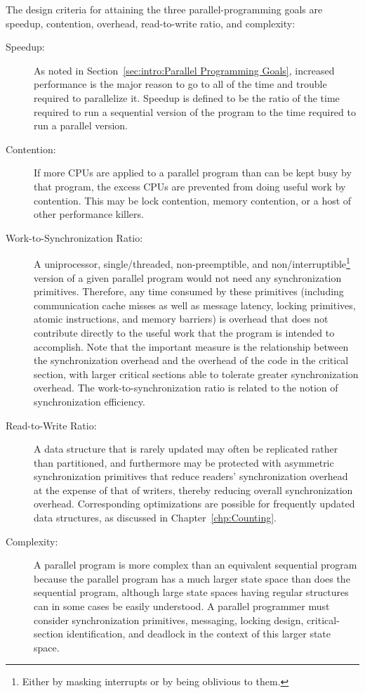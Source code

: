 The design criteria for attaining the three parallel-programming goals
are speedup,
contention, overhead, read-to-write ratio, and complexity:
\begin{description}
\item[Speedup:]  As noted in
	Section~\ref{sec:intro:Parallel Programming Goals},
	increased performance is the major reason
	to go to all of the time and trouble
	required to parallelize it.
	Speedup is defined to be the ratio of the time required
	to run a sequential version of the program to the time
	required to run a parallel version.
\item[Contention:]  If more CPUs are applied to a parallel
	program than can be kept busy by that program,
	the excess CPUs are prevented from doing
	useful work by contention.
	This may be lock contention, memory contention, or a host
	of other performance killers.
\item[Work-to-Synchronization Ratio:]  A uniprocessor,
	single\-/threaded, non-preemptible, and non\-/interruptible\footnote{
		Either by masking interrupts or by being oblivious to them.}
	version of a given parallel
	program would not need any synchronization primitives.
	Therefore, any time consumed by these primitives
	(including communication cache misses as well as
	message latency, locking primitives, atomic instructions,
	and memory barriers)
	is overhead that does not contribute directly to the useful
	work that the program is intended to accomplish.
	Note that the important measure is the
	relationship between the synchronization overhead
	and the overhead of the code in the critical section, with larger
	critical sections able to tolerate greater synchronization overhead.
	The work-to-synchronization ratio is related to
	the notion of synchronization efficiency.
\item[Read-to-Write Ratio:]  A data structure that is
	rarely updated may often be replicated rather than partitioned,
	and furthermore may be protected with asymmetric
	synchronization primitives that reduce readers' synchronization
	overhead at the expense of that of writers, thereby
	reducing overall synchronization overhead.
	Corresponding optimizations are possible for frequently
	updated data structures, as discussed in
	Chapter~\ref{chp:Counting}.
\item[Complexity:]  A parallel program is more complex than
	an equivalent sequential program because the parallel program
	has a much larger state space than does the sequential program,
	although large state spaces having regular structures can in
	some cases be easily understood.
	A parallel programmer must
	consider synchronization primitives, messaging, locking design,
	critical-section identification,
	and deadlock in the context of this larger state space.


\end{description}
